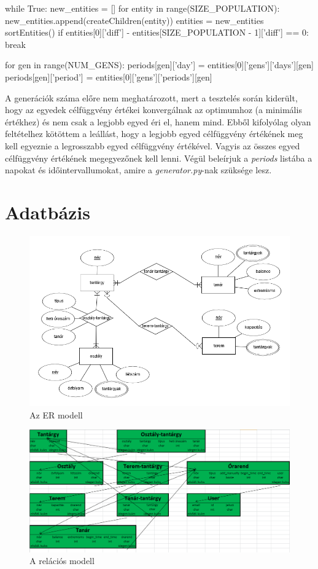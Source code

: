 \begin{python}
while True:
    new_entities = []
    for entity in range(SIZE_POPULATION):
        new_entities.append(createChildren(entity))
    entities = new_entities
    sortEntities()
    if entities[0]['diff'] - entities[SIZE_POPULATION - 1]['diff'] == 0:
        break

for gen in range(NUM_GENS):
    periods[gen]['day'] = entities[0]['gens']['days'][gen]
    periods[gen]['period'] = entities[0]['gens']['periods'][gen]
\end{python}

A generációk száma előre nem meghatározott, mert a tesztelés során kiderült, hogy az egyedek célfüggvény értékei konvergálnak az optimumhoz (a minimális értékhez) és nem csak a legjobb egyed éri el, hanem mind. Ebből kifolyólag olyan feltételhez kötöttem a leállást, hogy a legjobb egyed célfüggvény értékének meg kell egyeznie a legrosszabb egyed célfüggvény értékével. Vagyis az összes egyed célfüggvény értékének megegyezőnek kell lenni. Végül beleírjuk a \textit{periods} listába a napokat és időintervallumokat, amire a \textit{generator.py}-nak szüksége lesz.

\section{Adatbázis}

\begin{figure}[h!]
\includegraphics[width=\linewidth]{images/ermodell.png}
\caption{Az ER modell}
\label{fig:er}
\end{figure}

\begin{figure}[h!]
\includegraphics[width=\linewidth]{images/relmodell.png}
\caption{A relációs modell}
\label{fig:relacios}
\end{figure}

